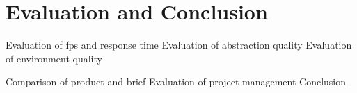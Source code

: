 \chapter{Evaluation and Conclusion}
\label{chapter:eval}

Evaluation of fps and response time
Evaluation of abstraction quality
Evaluation of environment quality

Comparison of product and brief
Evaluation of project management
Conclusion